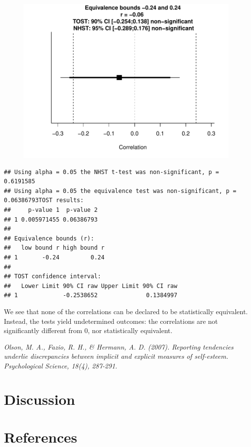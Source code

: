 \documentclass[english,man]{apa6}
\theoremstyle{definition}
\theoremstyle{definition}
\theoremstyle{definition}
\theoremstyle{remark}
\begin{document}
\begin{figure}[htbp]
\centering
\includegraphics{manuscript_files/figure-latex/unnamed-chunk-11-1.pdf}
\caption{}
\end{figure}

\begin{verbatim}
## Using alpha = 0.05 the NHST t-test was non-significant, p = 0.6191585
## Using alpha = 0.05 the equivalence test was non-significant, p = 0.06386793TOST results:
##     p-value 1  p-value 2
## 1 0.005971455 0.06386793
## 
## Equivalence bounds (r):
##   low bound r high bound r
## 1       -0.24         0.24
## 
## TOST confidence interval:
##   Lower Limit 90% CI raw Upper Limit 90% CI raw
## 1             -0.2538652              0.1384997
\end{verbatim}

We see that none of the correlations can be declared to be statistically
equivalent. Instead, the tests yield undetermined outcomes: the
correlations are not significantly different from 0, nor statistically
equivalent.

\emph{Olson, M. A., Fazio, R. H., \& Hermann, A. D. (2007). Reporting
tendencies underlie discrepancies between implicit and explicit measures
of self-esteem. Psychological Science, 18(4), 287-291.}

\section{Discussion}\label{discussion}

\newpage

\section{References}\label{references}
\end{document}
